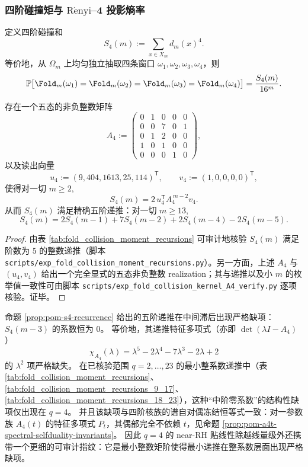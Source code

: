 \subsubsection{四阶碰撞矩与 \texorpdfstring{$\mathrm{R\acute{e}nyi}$}{Renyi}--4 投影熵率}\label{subsec:pom-s4}
\begin{definition}[四阶折叠碰撞矩]\label{def:pom-s4}
定义四阶碰撞和
$$
S_4(m):=\sum_{x\in X_m} d_m(x)^4.
$$
等价地，从 \(\Omega_m\) 上均匀独立抽取四条窗口 \(\omega_1,\omega_2,\omega_3,\omega_4\)，则
$$
\mathbb{P}\bigl[\Fold_m(\omega_1)=\Fold_m(\omega_2)=\Fold_m(\omega_3)=\Fold_m(\omega_4)\bigr]=\frac{S_4(m)}{16^m}.
$$
\end{definition}

\begin{proposition}\label{prop:pom-s4-recurrence}
存在一个五态的非负整数矩阵
$$
A_4:=
\begin{pmatrix}
0&1&0&0&0\\
0&0&7&0&1\\
0&1&2&0&0\\
1&0&1&0&0\\
0&0&0&1&0
\end{pmatrix},
$$
以及读出向量
$$
u_4:=(9,404,1613,25,114)^{\mathsf T},\qquad
v_4:=(1,0,0,0,0)^{\mathsf T},
$$
使得对一切 \(m\ge 2\),
$$
S_4(m)=2\,u_4^{\mathsf T}A_4^{\,m-2}v_4.
$$
从而 \(S_4(m)\) 满足精确五阶递推：对一切 \(m\ge 13\),
$$
S_4(m)=2S_4(m-1)+7S_4(m-2)+2S_4(m-4)-2S_4(m-5).
$$
\end{proposition}
\begin{proof}
由表 \ref{tab:fold_collision_moment_recursions} 可审计地核验 \(S_4(m)\) 满足阶数为 \(5\) 的整数递推（脚本 \texttt{scripts/exp\_fold\_collision\_moment\_recursions.py}）。另一方面，上述 \(A_4\) 与 \((u_4,v_4)\) 给出一个完全显式的五态非负整数 realization；其与递推以及小 \(m\) 的枚举值一致性可由脚本 \texttt{scripts/exp\_fold\_collision\_kernel\_A4\_verify.py} 逐项核验。证毕。
\end{proof}

\begin{remark}\label{rem:pom-s4-zero-coefficient-lock}
命题 \ref{prop:pom-s4-recurrence} 给出的五阶递推在中间滞后出现严格缺项：\(S_4(m-3)\) 的系数恒为 \(0\)。
等价地，其递推特征多项式（亦即 \(\det(\lambda I-A_4)\)）
\[
\chi_{A_4}(\lambda)=\lambda^5-2\lambda^4-7\lambda^3-2\lambda+2
\]
的 \(\lambda^2\) 项严格缺失。
在已核验范围 \(q=2,\dots,23\) 的最小整系数递推中（表 \ref{tab:fold_collision_moment_recursions}、\ref{tab:fold_collision_moment_recursions_9_17}、\ref{tab:fold_collision_moment_recursions_18_23}），这种“中阶零系数”的结构性缺项仅出现在 \(q=4\)。
并且该缺项与四阶核族的谱自对偶冻结恒等式一致：对一参数族 \(A_4(t)\) 的特征多项式 \(P_t\)，其偶部完全不依赖 \(t\)，见命题 \ref{prop:pom-a4t-spectral-selfduality-invariants}。
因此 \(q=4\) 的 near-RH 贴线性除越线量级外还携带一个更细的可审计指纹：它是最小整数矩阶使得最小递推在整系数层面出现严格缺项。
\end{remark}

